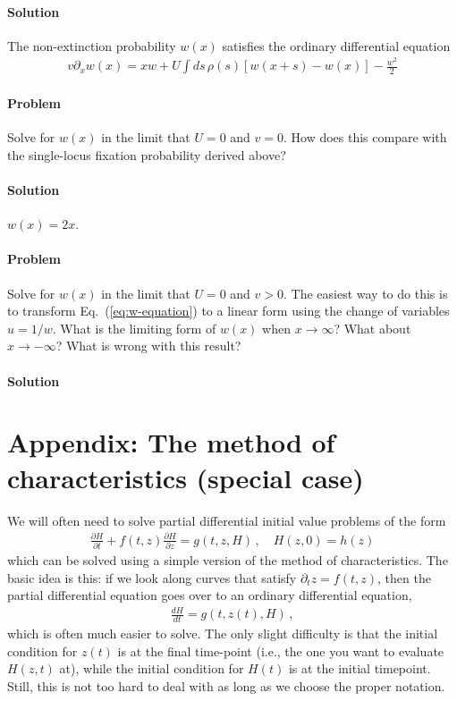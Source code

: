 \documentclass[11pt]{article}
\newcommand{\eq}[1]{Eq.~(\ref{#1})}
\begin{document}
\paragraph{Solution} The non-extinction probability $w(x)$ satisfies the ordinary differential equation 
\begin{align}
\label{eq:w-equation}
v \partial_x w(x) = x w + U \int ds \, \rho(s) \left[ w(x+s) - w(x) \right] - \frac{w^2}{2} 
\end{align}

\paragraph{Problem} Solve for $w(x)$ in the limit that $U=0$ and $v=0$. How does this compare with the single-locus fixation probability derived above? 

\paragraph{Solution} $w(x) = 2x$. 

\paragraph{Problem} Solve for $w(x)$ in the limit that $U=0$ and $v>0$. The easiest way to do this is to transform \eq{eq:w-equation} to a linear form using the change of variables $u=1/w$. What is the limiting form of $w(x)$ when $x \to \infty$? What about $x \to -\infty$? What is wrong with this result?

\paragraph{Solution}

\section{Appendix: The method of characteristics (special case)}

We will often need to solve partial differential initial value problems of the form
\begin{align}
\frac{\partial H}{\partial t} + f(t,z) \frac{\partial H}{\partial z} = g(t,z,H) \, , \quad H(z,0) = h(z) 
\end{align}
which can be solved using a simple version of the method of characteristics. The basic idea is this: if we look along curves that satisfy $\partial_t z = f(t,z)$, then the partial differential equation goes over to an ordinary differential equation,
\begin{align}
\frac{d H}{dt} = g(t,z(t),H) \, ,
\end{align} 
which is often much easier to solve. The only slight difficulty is that the initial condition for $z(t)$ is at the final time-point (i.e., the one you want to evaluate $H(z,t)$ at), while the initial condition for $H(t)$ is at the initial timepoint. Still, this is not too hard to deal with as long as we choose the proper notation. 
\end{document}
